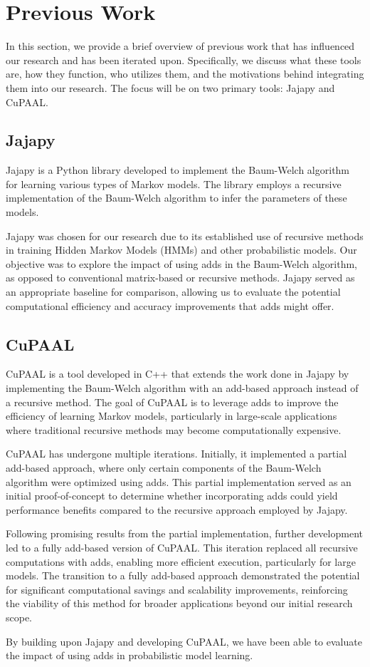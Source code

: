 \section{Previous Work}\label{sec:jajapy_and_cupaal}
In this section, we provide a brief overview of previous work that has influenced our research and has been iterated upon.
Specifically, we discuss what these tools are, how they function, who utilizes them, and the motivations behind integrating them into our research.
The focus will be on two primary tools: Jajapy and CuPAAL.


\subsection{Jajapy}\label{subsec:jajapy}
Jajapy is a Python library developed to implement the Baum-Welch algorithm for learning various types of Markov models.
The library employs a recursive implementation of the Baum-Welch algorithm to infer the parameters of these models.

Jajapy was chosen for our research due to its established use of recursive methods in training Hidden Markov Models (HMMs) and other probabilistic models.
Our objective was to explore the impact of using \glspl{add} in the Baum-Welch algorithm, as opposed to conventional matrix-based or recursive methods.
Jajapy served as an appropriate baseline for comparison, allowing us to evaluate the potential computational efficiency and accuracy improvements that \glspl{add} might offer.


\subsection{CuPAAL}\label{subsec:cupaal}
CuPAAL is a tool developed in C++ that extends the work done in Jajapy by implementing the Baum-Welch algorithm with an \gls{add}-based approach instead of a recursive method.
The goal of CuPAAL is to leverage \glspl{add} to improve the efficiency of learning Markov models, particularly in large-scale applications where traditional recursive methods may become computationally expensive.

CuPAAL has undergone multiple iterations. Initially, it implemented a partial \gls{add}-based approach, where only certain components of the Baum-Welch algorithm were optimized using \glspl{add}.
This partial implementation served as an initial proof-of-concept to determine whether incorporating \glspl{add} could yield performance benefits compared to the recursive approach employed by Jajapy.

Following promising results from the partial implementation, further development led to a fully \gls{add}-based version of CuPAAL.
This iteration replaced all recursive computations with \glspl{add}, enabling more efficient execution, particularly for large models.
The transition to a fully \gls{add}-based approach demonstrated the potential for significant computational savings and scalability improvements, reinforcing the viability of this method for broader applications beyond our initial research scope.

By building upon Jajapy and developing CuPAAL, we have been able to evaluate the impact of using \glspl{add} in probabilistic model learning.
